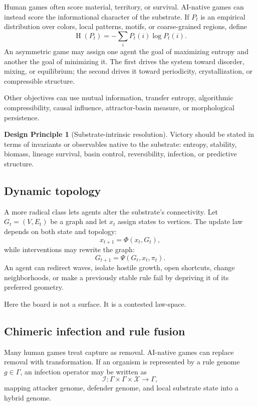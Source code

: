 \documentclass[11pt,a4paper]{article}
\theoremstyle{plain}
\theoremstyle{definition}
\newtheorem{principle}[theorem]{Design Principle}
\newcommand{\X}{\mathcal{X}}
\DeclareMathOperator{\Ent}{H}
\begin{document}
Human games often score material, territory, or survival. AI-native games can instead score the informational character of the substrate. If $P_t$ is an empirical distribution over colors, local patterns, motifs, or coarse-grained regions, define
\[
  \Ent(P_t)=-\sum_i P_t(i)\log P_t(i).
\]
An asymmetric game may assign one agent the goal of maximizing entropy and another the goal of minimizing it. The first drives the system toward disorder, mixing, or equilibrium; the second drives it toward periodicity, crystallization, or compressible structure.

Other objectives can use mutual information, transfer entropy, algorithmic compressibility, causal influence, attractor-basin measure, or morphological persistence.

\begin{principle}[Substrate-intrinsic resolution]\label{prin:intrinsic-resolution}
Victory should be stated in terms of invariants or observables native to the substrate: entropy, stability, biomass, lineage survival, basin control, reversibility, infection, or predictive structure.
\end{principle}

\subsection{Dynamic topology}\label{subsec:topology}

A more radical class lets agents alter the substrate's connectivity. Let $G_t=(V,E_t)$ be a graph and let $x_t$ assign states to vertices. The update law depends on both state and topology:
\[
  x_{t+1}=\Phi(x_t,G_t),
\]
while interventions may rewrite the graph:
\[
  G_{t+1}=\Psi(G_t,x_t,\pi_t).
\]
An agent can redirect waves, isolate hostile growth, open shortcuts, change neighborhoods, or make a previously stable rule fail by depriving it of its preferred geometry.

Here the board is not a surface. It is a contested law-space.

\subsection{Chimeric infection and rule fusion}\label{subsec:infection}

Many human games treat capture as removal. AI-native games can replace removal with transformation. If an organism is represented by a rule genome $g\in\Gamma$, an infection operator may be written as
\[
  \mathcal{I}:\Gamma\times\Gamma\times\X\to\Gamma,
\]
mapping attacker genome, defender genome, and local substrate state into a hybrid genome.
\end{document}
